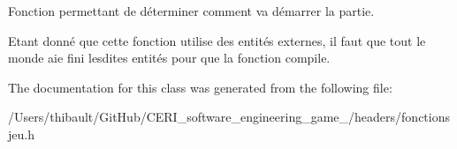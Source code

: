 Fonction permettant de déterminer comment va démarrer la partie. 

Etant donné que cette fonction utilise des entités externes, il faut que tout le monde aie fini lesdites entités pour que la fonction compile. 

The documentation for this class was generated from the following file\+:\begin{DoxyCompactItemize}
\item 
/\+Users/thibault/\+Git\+Hub/\+C\+E\+R\+I\+\_\+software\+\_\+engineering\+\_\+game\+\_/headers/fonctionsjeu.\+h\end{DoxyCompactItemize}
